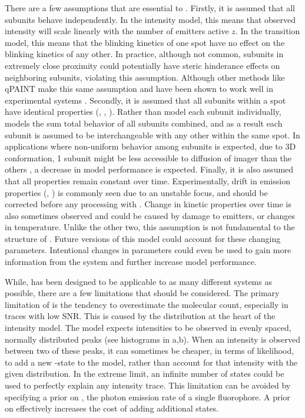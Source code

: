 There are a few assumptions that are essential to \ours.
    Firstly, it is assumed that all subunits behave independently.
    In the intensity model, this means that observed intensity will scale linearly with the number of emitters active $z$.
    In the transition model, this means that the blinking kinetics of one spot have no effect on the blinking kinetics of any other.
    In practice, although not common, subunits in extremely close proximity could potentially 
    have steric hinderance effects on neighboring subunits, violating this assumption.
    Although other methods like qPAINT make this same assumption and have been shown to work well in experimental systems \cite{}. 
    Secondly, it is assumed that all subunits within a spot have identical properties (\pon, \poff, \re).
    Rather than model each subunit individually, \ours models the sum total behavior of all subunits combined, 
    and as a result each subunit is assumed to be interchangeable with any other within the same spot.
    In applications where non-uniform behavior among subunits is expected, \eg due to 3D conformation, 
    1 subunit might be less accessible to diffusion of imager than the others \cite{civitci_2020}, a decrease in model performance is expected.
    Finally, it is also assumed that all properties remain constant over time. 
    Experimentally, drift in emission properties (\re, \rb) is commonly seen due to an unstable focus, and should be corrected before any processing with \ours.
    Change in kinetic properties over time is also sometimes observed and could be caused by damage to emitters, or changes in temperature. 
    Unlike the other two, this assumption is not fundamental to the structure of \ours. 
    Future versions of this model could account for these changing parameters.
    Intentional changes in parameters could even be used to gain more information from the system and further increase model performance. 
    

While, \ours has been designed to be applicable to as many different systems as possible, 
there are a few limitations that should be considered.
    The primary limitation of \ours is the tendency to overestimate the molecular count, 
    especially in traces with low SNR. 
    This is caused by the distribution at the heart of the intensity model. 
    The model expects intensities to be observed in evenly spaced, normally distributed 
    peaks (see histograms in a,b).
    When an intensity is observed between two of these peaks, it can sometimes be cheaper, 
    in terms of likelihood, to add a new \z{}-state to the model,
    rather than account for that intensity with the given distribution.
    In the extreme limit, an infinite number of states could be used to perfectly explain any intensity trace.
    This limitation can be avoided by specifying a prior on \re, the photon emission rate of a single fluorophore. 
    A prior on \re effectively increases the cost of adding additional states.

